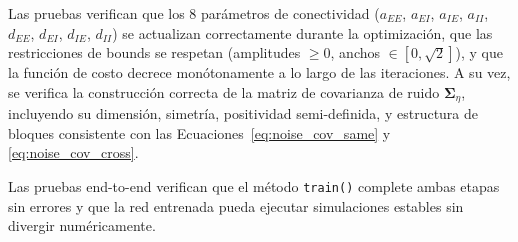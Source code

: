 Las pruebas verifican que los 8 parámetros de conectividad ($a_{EE}$, $a_{EI}$, $a_{IE}$, $a_{II}$, $d_{EE}$, $d_{EI}$, $d_{IE}$, $d_{II}$) se actualizan correctamente durante la optimización, que las restricciones de bounds se respetan (amplitudes $\geq 0$, anchos $\in [0, \sqrt{2}]$), y que la función de costo decrece monótonamente a lo largo de las iteraciones. A su vez, se verifica la construcción correcta de la matriz de covarianza de ruido $\boldsymbol{\Sigma}_\eta$, incluyendo su dimensión, simetría, positividad semi-definida, y estructura de bloques consistente con las Ecuaciones~\ref{eq:noise_cov_same} y \ref{eq:noise_cov_cross}.

Las pruebas end-to-end verifican que el método \texttt{train()} complete ambas etapas sin errores y que la red entrenada pueda ejecutar simulaciones estables sin divergir numéricamente.








